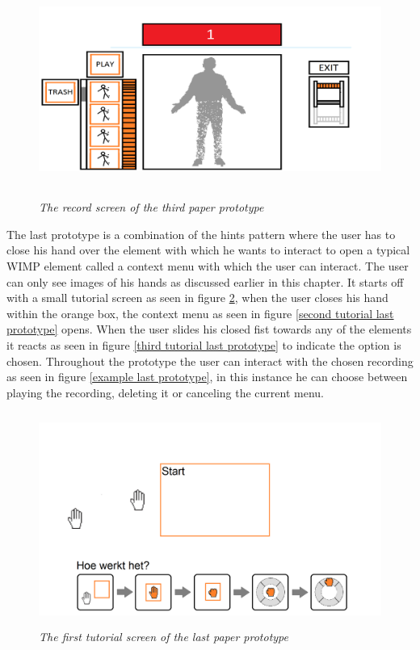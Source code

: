 \begin{figure}[H]
	\begin{center}
		\includegraphics[width=12.5cm, height=7cm]{figures/prototype_6_3_record.png}
		\caption{\emph{The record screen of the third paper prototype}}
		\label{record third prototype}
	\end{center}
\end{figure}

The last prototype is a combination of the hints pattern where the user has to close his hand over the element with which he wants to interact to open a typical WIMP element called a context menu with which the user can interact. The user can only see images of his hands as discussed earlier in this chapter. It starts off with a small tutorial screen as seen in figure \ref{first tutorial last prototype}, when the user closes his hand within the orange box, the context menu as seen in figure \ref{second tutorial last prototype} opens. When the user slides his closed fist towards any of the elements it reacts as seen in figure \ref{third tutorial last prototype} to indicate the option is chosen. Throughout the prototype the user can interact with the chosen recording as seen in figure \ref{example last prototype}, in this instance he can choose between playing the recording, deleting it or canceling the current menu.\\

\begin{figure}[H]
	\begin{center}
		\includegraphics[width=12.5cm, height=7cm]{figures/prototype_7_6_tutorial_1.png}
		\caption{\emph{The first tutorial screen of the last paper prototype}}
		\label{first tutorial last prototype}
	\end{center}
\end{figure}

